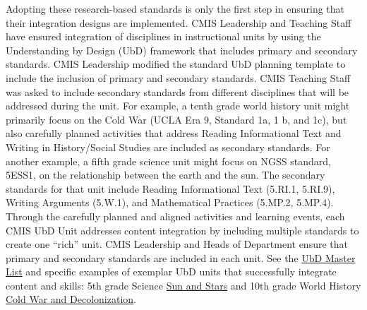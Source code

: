 \begin{findings}

Adopting these research-based standards is only the first step in ensuring that their integration designs are implemented. CMIS Leadership and Teaching Staff have ensured integration of disciplines in instructional units by using the Understanding by Design (UbD) framework that includes primary and secondary standards. CMIS Leadership modified the standard UbD planning template to include the inclusion of primary and secondary standards. CMIS Teaching Staff was asked to include secondary standards from different disciplines that will be addressed during the unit. For example, a tenth grade world history unit might primarily focus on the Cold War (UCLA Era 9, Standard 1a, 1 b, and 1c), but also carefully planned activities that address Reading Informational Text and Writing in History/Social Studies are included as secondary standards. For another example, a fifth grade science unit might focus on NGSS standard, 5ESS1, on the relationship between the earth and the sun. The secondary standards for that unit include Reading Informational Text (5.RI.1, 5.RI.9), Writing Arguments (5.W.1), and Mathematical Practices (5.MP.2, 5.MP.4). Through the carefully planned and aligned activities and learning events, each CMIS UbD Unit addresses content integration by including multiple  standards to create one ``rich'' unit. CMIS Leadership and Heads of Department ensure that primary and secondary standards are included in each unit. See the \href{https://docs.google.com/a/cmis.ac.th/document/d/1ai2pHgN5LfMH39fHhyltSgoXu4mHXESIZJy8zxWwnTQ/edit?usp=sharing}{UbD Master List} and specific examples of exemplar UbD units that successfully integrate content and skills: 5th grade Science \href{https://docs.google.com/a/cmis.ac.th/document/d/1MleNZcfzTrFoaZjuZ3KUoHXVj-M4iUok1Z-Kn7J89ig/edit?usp=sharing}{Sun and Stars} and 10th grade World History \href{https://docs.google.com/a/cmis.ac.th/document/d/1frGo6cvCkAkRJxEjcVsD9Ta9NOePFbclZCZFzOqbVPw/edit?usp=sharing}{Cold War and Decolonization}.



\end{findings}
